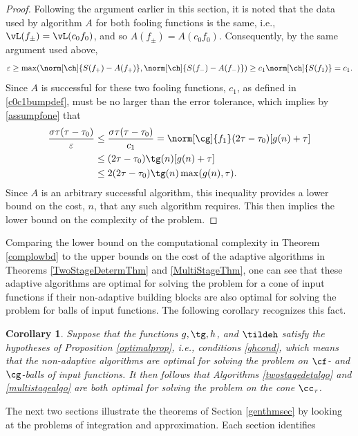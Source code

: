 \documentclass[]{elsarticle}
\newtheorem{cor}{Corollary}
\theoremstyle{definition}
\theoremstyle{remark}
\begin{document}
\begin{proof}
Following the argument earlier in this section, it is noted that the data used by algorithm $A$ for both fooling functions is the same, i.e., $\vL(f_{\pm})=\vL(c_0f_0)$, and so $A(f_{\pm})=A(c_0f_0)$.  Consequently, by the same argument used above, 
\[
\varepsilon  \ge  \max(\norm[\ch]{S(f_+)-A(f_+)},\norm[\ch]{S(f_-)-A(f_-)}) \ge c_1 \norm[\ch]{S(f_1)}=c_1.
\]
Since $A$ is successful for these two fooling functions, $c_1$, as defined in \eqref{c0c1bumpdef}, must be no larger than the error tolerance, which implies by \eqref{assumpfone} that 
\begin{align*}
\frac{\sigma \tau(\tau-\tau_0)}{\varepsilon} & \le \frac{\sigma \tau(\tau-\tau_0)}{c_1}  = \norm[\cg]{f_1} (2\tau - \tau_0) [g(n) + \tau] \\
&\le (2\tau - \tau_0) \tg(n) [g(n) + \tau] \\
&\le 2 (2\tau - \tau_0) \tg(n)\max(g(n), \tau).
\end{align*}
Since $A$ is an arbitrary successful algorithm, this inequality provides a lower bound on the cost, $n$, that any such algorithm requires.  This then implies the lower bound on the complexity of the problem.   
\end{proof}

Comparing the lower bound on the computational complexity in Theorem \ref{complowbd} to the upper bounds on the cost of the adaptive algorithms in Theorems \ref{TwoStageDetermThm} and \ref{MultiStageThm}, one can see that these adaptive algorithms are optimal for solving the problem for a cone of input functions if their non-adaptive building blocks are also optimal for solving the problem for balls of input functions.  The following corollary recognizes this fact.

\begin{cor} \label{optimcor}
Suppose that the functions $g, \tg, h$, and $\tildeh$ satisfy the hypotheses of Proposition \ref{optimalprop}, i.e., conditions \eqref{ghcond}, which means that the non-adaptive algorithms are optimal for solving the problem on $\cf$- and $\cg$-balls of input functions.  It then follows that Algorithms \ref{twostagedetalgo} and \ref{multistagealgo} are both optimal for solving the  problem on the cone $\cc_{\tau}$.  
\end{cor}

\vspace{1cm}

The next two sections illustrate the theorems of Section \ref{genthmsec} by looking at the problems of integration and approximation.  Each section identifies 
\end{document}
